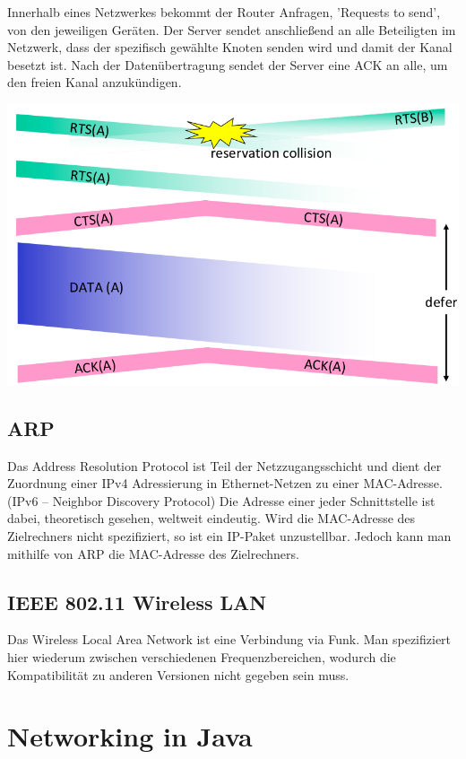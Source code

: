 \documentclass{scrartcl}
\begin{document}
    Innerhalb eines Netzwerkes bekommt der Router Anfragen, 'Requests to send', von den jeweiligen Geräten. Der Server sendet anschließend an alle Beteiligten im Netzwerk, dass der spezifisch gewählte Knoten senden wird und damit der Kanal besetzt ist. Nach der Datenübertragung sendet der Server eine ACK an alle, um den freien Kanal anzukündigen.
    \begin{center}
        \includegraphics[width=\textwidth]{CSMACA.png}
    \end{center}

    \subsection{ARP}
    Das Address Resolution Protocol ist Teil der Netzzugangsschicht und dient der Zuordnung einer IPv4 Adressierung in Ethernet-Netzen zu einer MAC-Adresse. (IPv6 -- Neighbor Discovery Protocol)
    Die Adresse einer jeder Schnittstelle ist dabei, theoretisch gesehen, weltweit eindeutig. Wird die MAC-Adresse des Zielrechners nicht spezifiziert, so ist ein IP-Paket unzustellbar. Jedoch kann man mithilfe von ARP die MAC-Adresse des Zielrechners.
    
    \subsection{IEEE 802.11 Wireless LAN}
    Das Wireless Local Area Network ist eine Verbindung via Funk. Man spezifiziert hier wiederum zwischen verschiedenen Frequenzbereichen, wodurch die Kompatibilität zu anderen Versionen nicht gegeben sein muss.
    



\section{Networking in Java}
\end{document}
